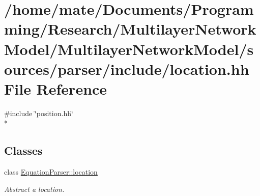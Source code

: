 \hypertarget{location_8hh}{}\section{/home/mate/\+Documents/\+Programming/\+Research/\+Multilayer\+Network\+Model/\+Multilayer\+Network\+Model/sources/parser/include/location.hh File Reference}
\label{location_8hh}
{\ttfamily \#include \char`\"{}position.\+hh\char`\"{}}\\*
\subsection*{Classes}
\begin{DoxyCompactItemize}
\item 
class \hyperlink{classEquationParser_1_1location}{Equation\+Parser\+::location}
\begin{DoxyCompactList}\small\item\em Abstract a location. \end{DoxyCompactList}\end{DoxyCompactItemize}
